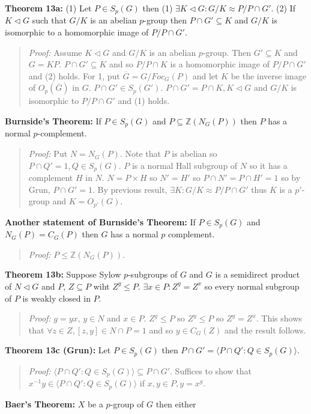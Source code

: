 {\bf Theorem 13a:}  (1) Let $P \in S_p(G)$ then (1) $\exists K \lhd G: G/K \approx P/ P \cap G'$.
(2) If $K \lhd G$ such that $G/K$ is an abelian $p$-group then $P \cap G' \subseteq K$ 
and $G/K$ is isomorphic to a homomorphic image of $P/P \cap G'$.
\begin{quote}
\emph{Proof:}  Assume $K \lhd G$ and $G/K$ is an abelian $p$-group.  Then $G' \subseteq K$ and
$G= KP$.  $P \cap G' \subseteq K$ and so $P/P \cap K$ is a homomorphic image of $P/P \cap G'$ and (2)
holds.  For 1, put ${\overline G} = G/Foc_G(P)$ and let
$K$ be the inverse image of $O_{p}({\overline G})$
in $G$.  $P \cap G' \in S_p(G')$.  
$P \cap G' = P \cap K, K \lhd G$ and $G/K$ is isomorphic to $P/P \cap G'$ and (1) holds.
\end{quote}
{\bf Burnside's Theorem:} 
If $P \in S_p(G)$ and $P \subseteq {\mathbb Z}(N_G(P))$ then $P$ has a normal
$p$-complement.
\begin{quote}
\emph{Proof:}  Put $N=N_G(P)$.  Note that $P$ is abelian so $P \cap Q'= 1, Q \in S_p(G)$.
$P$ is a normal Hall subgroup of $N$ so it has a complement $H$ in $N$.  $N= P \times H$ so
$N' = H'$ so $P \cap N' = P \cap H' = 1$ so by Grun, $P \cap G'=1$.  By previous result, $\exists K:
G/K \approx P/P \cap G'$ thus $K$ is a $p'$-group and $K= O_{p'}(G)$.
\end{quote}
{\bf Another statement of Burnside's Theorem:} 
If $P \in S_p(G)$ and $N_G(P) = C_G(P)$ then $G$ has a normal $p$ complement.
\begin{quote}
\emph{Proof:} 
$P \leq {\mathbb Z}(N_G(P))$.
\end{quote}
{\bf Theorem 13b:} Suppose Sylow $p$-subgroups of $G$ and $G$ is a semidirect product of $N \lhd G$ and $P$,
$Z \subseteq P$ wiht $Z^g \leq P$. $\exists x \in P: Z^g = Z^x$ so every normal subgroup of $P$ is weakly
closed in $P$.
\begin{quote}
\emph{Proof:} 
$g=yx$, $y \in N$ and $x \in P$.
$Z^g \leq P$ so $Z^y \leq P$ so $Z^g = Z^x$.
This shows that $\forall z \in Z, [z,y] \in N \cap P = 1$ and so
$y \in C_G(Z)$ and the result follows.
\end{quote}
{\bf Theorem 13c (Grun):} Let $P \in S_p(G)$ then $P \cap G' = \langle P \cap Q': Q \in S_p(G) \rangle$.
\begin{quote}
\emph{Proof:} 
$
\langle P \cap Q': Q \in S_p(G) \rangle \subseteq P \cap G'$.  Suffices to show that
$x^{-1}y \in \langle P \cap Q': Q \in S_p(G) \rangle$ if $x, y \in P, y=x^g$.
\end{quote}
{\bf Baer's Theorem:}
$X$ be a $p$-group of $G$ then either
